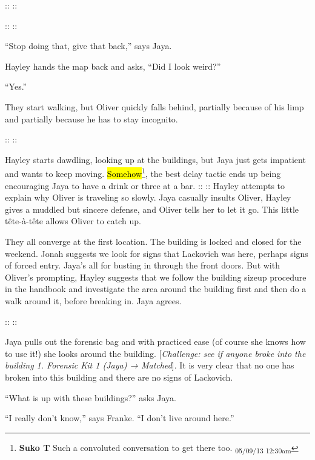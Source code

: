 ::  ::

::  ::

``Stop doing that, give that back,'' says Jaya.

Hayley hands the map back and asks, ``Did I look weird?''

``Yes.''



They start walking, but Oliver quickly falls behind, partially because of his limp and partially because he has to stay incognito.

::  ::

Hayley starts dawdling, looking up at the buildings, but Jaya just gets impatient and wants to keep moving.  \hl{Somehow}\footnote{\textbf{Suko T }Such a convoluted conversation to get there too. \textsubscript{05/09/13 12:30am}}, the best delay tactic ends up being encouraging Jaya to have a drink or three at a bar.  ::  ::  Hayley attempts to explain why Oliver is traveling so slowly.  Jaya casually insults Oliver, Hayley gives a muddled but sincere defense, and Oliver tells her to let it go.  This little tête-à-tête allows Oliver to catch up.



They all converge at the first location.  The building is locked and closed for the weekend.  Jonah suggests we look for signs that Lackovich was here, perhaps signs of forced entry.   Jaya's all for busting in through the front doors.  But with Oliver's prompting, Hayley suggests that we follow the building sizeup procedure in the handbook and investigate the area around the building first and then do a walk around it, before breaking in.  Jaya agrees.  



::  ::

Jaya pulls out the forensic bag and with practiced ease (of course she knows how to use it!) she looks around the building. {[}\textit{Challenge: see if anyone broke into the building 1. Forensic Kit 1 (Jaya) → Matched}{]}.  It is very clear that no one has broken into this building and there are no signs of Lackovich.



``What is up with these buildings?'' asks Jaya.

``I really don't know,'' says Franke.  ``I don't live around here.''

